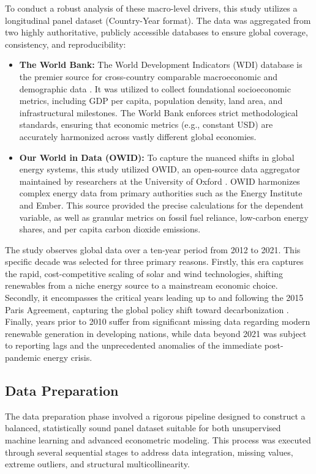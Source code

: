 \documentclass[a4paper,11pt]{article}
\begin{document}
To conduct a robust analysis of these macro-level drivers, this study utilizes a longitudinal panel dataset (Country-Year format). The data was aggregated from two highly authoritative, publicly accessible databases to ensure global coverage, consistency, and reproducibility:
\begin{itemize}
    \item \textbf{The World Bank:} The World Development Indicators (WDI) database is the premier source for cross-country comparable macroeconomic and demographic data \parencite{worldbank2023}. It was utilized to collect foundational socioeconomic metrics, including GDP per capita, population density, land area, and infrastructural milestones. The World Bank enforces strict methodological standards, ensuring that economic metrics (e.g., constant USD) are accurately harmonized across vastly different global economies.
    \item \textbf{Our World in Data (OWID):} To capture the nuanced shifts in global energy systems, this study utilized OWID, an open-source data aggregator maintained by researchers at the University of Oxford \parencite{owidenergy2023}. OWID harmonizes complex energy data from primary authorities such as the Energy Institute and Ember. This source provided the precise calculations for the dependent variable, as well as granular metrics on fossil fuel reliance, low-carbon energy shares, and per capita carbon dioxide emissions.
\end{itemize}

The study observes global data over a ten-year period from 2012 to 2021. This specific decade was selected for three primary reasons.
Firstly, this era captures the rapid, cost-competitive scaling of solar and wind technologies, shifting renewables from a niche energy source to a mainstream economic choice.
Secondly, it encompasses the critical years leading up to and following the 2015 Paris Agreement, capturing the global policy shift toward decarbonization \parencite{unfccc2015}.
Finally, years prior to 2010 suffer from significant missing data regarding modern renewable generation in developing nations, while data beyond 2021 was subject to reporting lags and the unprecedented anomalies of the immediate post-pandemic energy crisis.

\subsection{Data Preparation}

The data preparation phase involved a rigorous pipeline designed to construct a balanced, statistically sound panel dataset suitable for both unsupervised machine learning and advanced econometric modeling.
This process was executed through several sequential stages to address data integration, missing values, extreme outliers, and structural multicollinearity.
\end{document}
